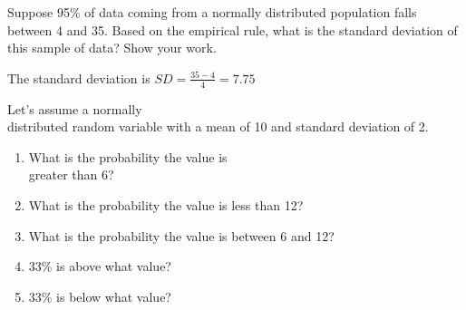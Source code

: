 \documentclass[11pt, chapterprefix=true]{scrbook}\usepackage[]{graphicx}\usepackage[]{color}
\begin{document}
\begin{exercises}
\begin{exercise}
	\end{exercise}
%
%
%

  \begin{exercise} %

Suppose 95\% of data coming from a normally distributed population falls between 4 and 35.  Based on the empirical rule, what is the standard deviation of this sample of data?  Show your work.

  \end{exercise}
  \begin{solution}   %



    The standard deviation is $SD = \frac{35 - 4}{4} = 7.75$
  \end{solution}

	\begin{exercise}  %

Let's assume a normally \\ distributed random variable with a mean of 10 and standard deviation of 2.

\begin{enumerate}
\item What is the probability the value is \\ greater than 6?
\item What is the probability the value is less than 12?
\item What is the probability the value is between 6 and 12?
\item 33\% is above what value?
\item 33\% is below what value?
\end{enumerate}


\end{exercise}
\end{exercises}
\end{document}
